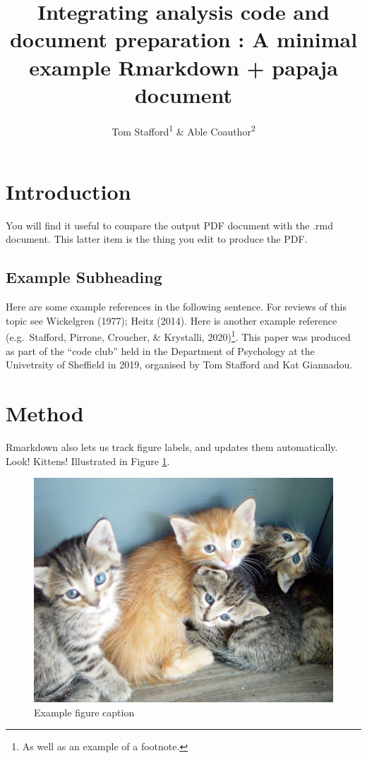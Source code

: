 \documentclass[
  english,
  ,jou,floatsintext]{apa6}
\title{Integrating analysis code and document preparation : A minimal example Rmarkdown + papaja document}
\author{Tom Stafford\textsuperscript{1} \& Able Coauthor\textsuperscript{2}}
\date{}
\affiliation{\vspace{0.5cm}\textsuperscript{1} Department of Psychology, University of Sheffield\\\textsuperscript{2} Department of Psychosocial Science, University of Bergen}
\begin{document}
\maketitle

\hypertarget{introduction}{%
\section{Introduction}\label{introduction}}

You will find it useful to compare the output PDF document with the .rmd document. This latter item is the thing you edit to produce the PDF.

\hypertarget{example-subheading}{%
\subsection{Example Subheading}\label{example-subheading}}

Here are some example references in the following sentence. For reviews of this topic see Wickelgren (1977); Heitz (2014). Here is another example reference (e.g.~Stafford, Pirrone, Croucher, \& Krystalli, 2020)\footnote{As well as an example of a footnote.}. This paper was produced as part of the \enquote{code club} held in the Department of Psychology at the Univetrsity of Sheffield in 2019, organised by Tom Stafford and Kat Giannadou.

\hypertarget{method}{%
\section{Method}\label{method}}

Rmarkdown also lets us track figure labels, and updates them automatically. Look! Kittens! Illustrated in Figure \ref{fig:examplefigurename}.

\begin{figure}

{\centering \includegraphics[width=0.75\linewidth]{figs/kittens} 

}

\caption{Example figure caption}\label{fig:examplefigurename}
\end{figure}
\end{document}
